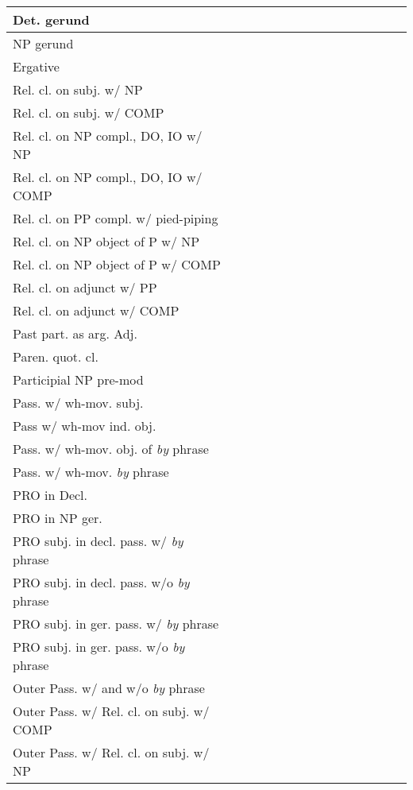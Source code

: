 \begin{center}
\begin{tabular}{|p{2.4in}||*{14}{c|}}
Det. gerund & & & & & & & & & & & & & & \\
\hline
NP gerund & & & & & & & & & & & & & & \\
\hline
Ergative & & & & & & & & & & & & & & \\
\hline
Rel. cl. on subj. w/ NP & & & & & & & & & & & & & & \\
\hline
Rel. cl. on subj. w/ COMP & & & & & & & & & & & & & & \\
\hline
Rel. cl. on NP compl., DO, IO w/ NP & & & & & & & & & & & & & & \\
\hline
Rel. cl. on NP compl., DO, IO w/ COMP & & & & & & & & & & & & & & \\
\hline
Rel. cl. on PP compl. w/ pied-piping & & & & & & & & & & & & & & \\
\hline
Rel. cl. on NP object of P w/ NP & & & & & & & & & & & & & & \\
\hline
Rel. cl. on NP object of P w/ COMP & & & & & & & & & & & & & & \\
\hline
Rel. cl. on adjunct w/ PP & & & & & & & & & & & & & & \\
\hline
Rel. cl. on adjunct w/ COMP & & & & & & & & & & & & & & \\
\hline
Past part. as arg. Adj. & & & & & & & & & & & & & & \\
\hline
Paren. quot. cl. & & & & & & & & & & & & & & \\
\hline
Participial NP pre-mod & & & & & & & & & & & & & & \\
\hline
Pass. w/ wh-mov. subj. & & & & & & & & & & & & & & \\
\hline
Pass w/ wh-mov ind. obj. & & & & & & & & & & & & & & \\
\hline
Pass. w/ wh-mov. obj. of  {\it by} phrase & & & & & & & & & & & & & & \\
\hline
Pass. w/ wh-mov. {\it by} phrase & & & & & & & & & & & & & & \\
\hline
PRO in Decl. & & & & & & & & & & & & & & \\
\hline
PRO in NP ger. & & & & & & & & & & & & & & \\
\hline
PRO subj. in decl. pass. w/ {\it by} phrase & & & & & & & & & & & & & & \\
\hline
PRO subj. in decl. pass. w/o {\it by} phrase & & & & & & & & & & & & & & \\
\hline
PRO subj. in ger. pass. w/ {\it by} phrase & & & & & & & & & & & & & & \\
\hline
PRO subj. in ger. pass. w/o {\it by} phrase & & & & & & & & & & & & & & \\
\hline
Outer Pass. w/ and w/o {\it by} phrase & & & & & & & & & & & & & & \\
\hline
Outer Pass. w/ Rel. cl. on subj. w/ COMP & & & & & & & & & & & & & & \\
\hline
Outer Pass. w/ Rel. cl. on subj. w/ NP & & & & & & & & & & & & & & \\
\hline
\end{tabular}
\end{center}

